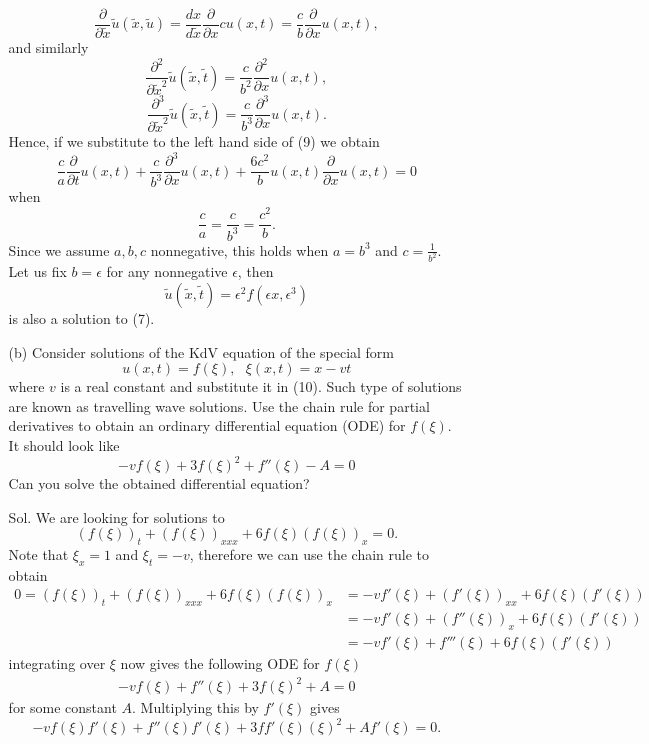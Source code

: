 \documentclass[]{report}
\begin{document}
\begin{itemize}
\begin{itemize}
		\[\frac{\partial}{\partial\tilde{x}}\tilde{u}(\tilde{x},\tilde{u})=\frac{dx}{d\tilde{x}}\frac{\partial}{\partial x}cu(x,t)=\frac{c}{b}\frac{\partial}{\partial x} u(x,t),\]
		and similarly
		\[\frac{\partial^2}{\partial\tilde{x}^2}\tilde{u}(\tilde{x},\tilde{t})=\frac{c}{b^2}\frac{\partial^2}{\partial x}u(x,t),\]
		\[\frac{\partial^3}{\partial\tilde{x}^2}\tilde{u}(\tilde{x},\tilde{t})=\frac{c}{b^3}\frac{\partial^3}{\partial x}u(x,t).\]
		Hence, if we substitute to the left hand side of (9) we obtain
		\[\frac{c}{a}\frac{\partial}{\partial t} u(x,t)+\frac{c}{b^3}\frac{\partial^3}{\partial x}u(x,t) + \frac{6c^2}{b}u(x,t)\frac{\partial}{\partial x} u(x,t)=0\]
		when
		\[\frac{c}{a}=\frac{c}{b^3}=\frac{c^2}{b}.\]
		Since we assume $a,b,c$ nonnegative, this holds when $a=b^3$ and $c=\frac{1}{b^2}$. Let us fix $b=\epsilon$ for any nonnegative $\epsilon$, then 
		\[\tilde{u}(\tilde{x},\tilde{t}) = \epsilon^2f(\epsilon x, \epsilon^3)\]
		is also a solution to (7). 
		\item[(b)] Consider solutions of the KdV equation of the special form
		\begin{equation}
			u(x,t)=f(\xi), \ \ \  \xi(x,t)=x-vt
		\end{equation}
		where $v$ is a real constant and substitute it in (10). Such type of solutions are known as travelling wave solutions. Use the chain rule for partial derivatives to obtain an ordinary differential equation (ODE) for $f(\xi)$. It should look like
		\begin{equation}
			-vf(\xi)+3f(\xi)^2 +f''(\xi)-A=0 
		\end{equation}
		Can you solve the obtained differential equation?
		\item[Sol.]  We are looking for solutions to
		\[(f(\xi))_t + (f(\xi))_{xxx}+6f(\xi)(f(\xi))_x=0.\]
		Note that $\xi_x=1$ and $\xi_t=-v$, therefore we can use the chain rule to obtain
		\begin{align*}
			0= (f(\xi))_t + (f(\xi))_{xxx}+6f(\xi)(f(\xi))_x &= -vf'(\xi)+(f'(\xi))_{xx}+6f(\xi)(f'(\xi))\\
			&=-vf'(\xi)+(f''(\xi))_x+6f(\xi)(f'(\xi))\\
			&=-vf'(\xi)+f'''(\xi)+6f(\xi)(f'(\xi))
		\end{align*}
		integrating over $\xi$ now gives the following ODE for $f(\xi)$
		\begin{align*}
			-vf(\xi)+f''(\xi)+3f(\xi)^2+A = 0
		\end{align*}
		for some constant $A$.
		Multiplying this by $f'(\xi)$ gives
		\[-vf(\xi)f'(\xi)+f''(\xi)f'(\xi)+3ff'(\xi)(\xi)^2+Af'(\xi) = 0.\]

\end{itemize}
\end{itemize}
\end{document}
